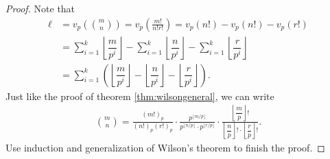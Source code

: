 \documentclass{subfile}
\begin{document}
	\begin{proof}
		Note that
			\begin{align*}
				\ell &= v_p\left(\binom{m}{n}\right) = v_p\left(\frac{m!}{n!r!}\right) = v_p(n!)-v_p(n!)-v_p(r!)\\
				&=\sum_{i=1}^{k}\left\lfloor\dfrac{m}{p^i}\right\rfloor - \sum_{i=1}^{k}\left\lfloor\dfrac{n}{p^i}\right\rfloor -\sum_{i=1}^{k}\left\lfloor\dfrac{r}{p^i}\right\rfloor\\
				&=\sum_{i=1}^{k}\left(\left\lfloor\dfrac{m}{p^i}\right\rfloor - \left\lfloor\dfrac{n}{p^i}\right\rfloor - \left\lfloor\dfrac{r}{p^i}\right\rfloor \right).
			\end{align*}
		Just like the proof of theorem \eqref{thm:wilsongeneral}, we can write
			\begin{align*}
				\binom {m}{n}=\frac{(m!)_p}{(n!)_p (r!)_p}\cdot
				\frac{p^{\lfloor m/p\rfloor}}{p^{\lfloor n/p\rfloor} \cdot p^{\lfloor r/p\rfloor}}\cdot
				\frac{\left\lfloor\dfrac{m}{p}\right\rfloor!}{\left\lfloor\dfrac{n}{p}\right\rfloor! \cdot \left\lfloor\dfrac{r}{p}\right\rfloor!}.
			\end{align*}
		Use induction and generalization of Wilson's theorem to finish the proof.
	\end{proof}
	
	
\end{document}
